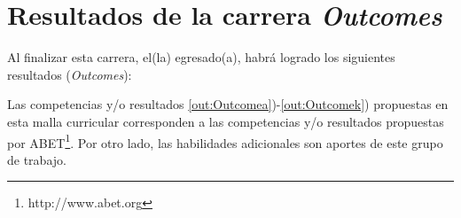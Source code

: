 \section{Resultados de la carrera {\it Outcomes}}\label{sec:outcomes}
Al finalizar esta carrera, el(la) egresado(a), habrá  logrado los siguientes resultados ({\it Outcomes}):



Las competencias y/o resultados \ref{out:Outcomea})-\ref{out:Outcomek}) propuestas en esta malla curricular corresponden a las 
competencias y/o resultados propuestas por ABET\footnote{http://www.abet.org}.
Por otro lado, las habilidades adicionales son aportes de este grupo de trabajo.